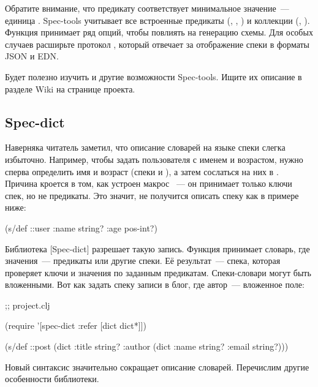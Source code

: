 Обратите внимание, что предикату  соответствует минимальное
значение~--- единица . Spec-tools учитывает все встроенные предикаты
(, , ) и коллекции (,
). Функция  принимает ряд опций, чтобы повлиять на
генерацию схемы. Для особых случаев расширьте протокол ,
который отвечает за отображение спеки в форматы JSON и EDN.

Будет полезно изучить и другие возможности Spec-tools. Ищите их описание в
разделе Wiki на странице проекта.

\subsection{Spec-dict}

Наверняка читатель заметил, что описание словарей на языке спеки слегка
избыточно. Например, чтобы задать пользователя с именем и возрастом, нужно
сперва определить имя и возраст (спеки  и ), а
затем сослаться на них в . Причина кроется в том, как устроен
макрос ~--- он принимает только ключи спек, но не предикаты. Это
значит, не получится описать спеку как в примере ниже:

\begin{clojure}
(s/def ::user
  {:name string?
   :age pos-int?})
\end{clojure}

Библиотека [Spec-dict]
разрешает такую запись. Функция  принимает словарь, где значения~--- предикаты
или другие спеки. Её результат~--- спека, которая проверяет ключи и значения
по заданным предикатам. Спеки-словари могут быть вложенными. Вот как задать
спеку записи в блог, где автор~--- вложенное поле:

\begin{clojure}
 ;; project.clj

(require '[spec-dict :refer [dict dict*]])

(s/def ::post
 (dict {:title string?
        :author (dict {:name string?
                       :email string?})}))
\end{clojure}

Новый синтаксис значительно сокращает описание словарей. Перечислим другие
особенности библиотеки.

